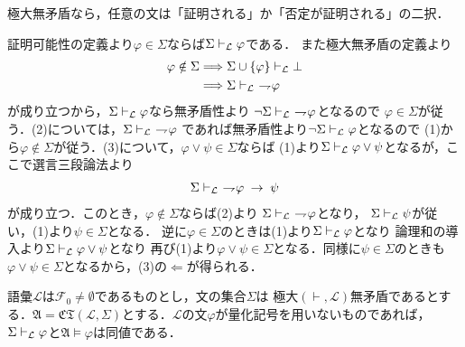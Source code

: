 	極大無矛盾なら，任意の文は「証明される」か「否定が証明される」の二択．
	
	\begin{sketch}
		証明可能性の定義より$\varphi \in \Sigma$ならば$\Sigma \vdash_{{\scriptsize \mathcal{L}}} \varphi$である．
		また極大無矛盾の定義より
		\begin{align}
			\varphi \notin \Sigma 
			&\Longrightarrow \Sigma \cup \{\varphi\} \provable{\mathcal{L}} \bot \\
			&\Longrightarrow \Sigma \provable{\mathcal{L}}\ \negation \varphi
		\end{align}
		が成り立つから，$\Sigma \vdash_{{\scriptsize \mathcal{L}}} \varphi$なら無矛盾性より
		$\neg \Sigma \vdash_{{\scriptsize \mathcal{L}}}\ \rightharpoondown\hspace{-0.25em} \varphi$となるので
		$\varphi \in \Sigma$が従う．(2)については，$\Sigma \vdash_{{\scriptsize \mathcal{L}}}\ \rightharpoondown\hspace{-0.25em} \varphi$
		であれば無矛盾性より$\neg \Sigma \vdash_{{\scriptsize \mathcal{L}}} \varphi$となるので
		(1)から$\varphi \notin \Sigma$が従う．(3)について，$\varphi \vee \psi \in \Sigma$ならば
		(1)より$\Sigma \vdash_{{\scriptsize \mathcal{L}}} \varphi \vee \psi$となるが，ここで選言三段論法より
		\begin{align}
			\Sigma \vdash_{{\scriptsize \mathcal{L}}}\ \rightharpoondown\hspace{-0.25em} \varphi \hspace{0.25em}\rightarrow\hspace{0.25em} \psi
		\end{align}
		が成り立つ．このとき，$\varphi \notin \Sigma$ならば(2)より
		$\Sigma \vdash_{{\scriptsize \mathcal{L}}}\ \rightharpoondown\hspace{-0.25em} \varphi$となり，
		$\Sigma \vdash_{{\scriptsize \mathcal{L}}} \psi$が従い，(1)より$\psi \in \Sigma$となる．
		逆に$\varphi \in \Sigma$のときは(1)より$\Sigma \vdash_{{\scriptsize \mathcal{L}}} \varphi$となり
		論理和の導入より$\Sigma \vdash_{{\scriptsize \mathcal{L}}} \varphi \vee \psi$となり
		再び(1)より$\varphi \vee \psi \in \Sigma$となる．同様に$\psi \in \Sigma$のときも
		$\varphi \vee \psi \in \Sigma$となるから，(3)の$\Longleftarrow$が得られる．
		\QED
	\end{sketch}
	
	\begin{screen}
		\begin{thm}[補題2.12.14]
			語彙$\mathcal{L}$は$\mathcal{F}_{0} \neq \emptyset$であるものとし，文の集合$\Sigma$は
			極大$(\vdash,\mathcal{L})$無矛盾であるとする．$\mathfrak{A} = \mathfrak{CT}
			(\mathcal{L},\Sigma)$とする．$\mathcal{L}$の文$\varphi$が量化記号を用いないものであれば，
			$\Sigma \vdash_{{\scriptsize \mathcal{L}}} \varphi$と$\mathfrak{A} \models \varphi$は同値である．
		\end{thm}
	\end{screen}